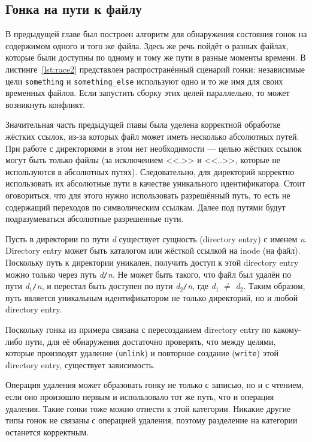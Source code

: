 \subsection{Гонка на пути к файлу}
\label{subsec:path-race}



В предыдущей главе был построен алгоритм для обнаружения состояния гонок на содержимом одного и того же файла. Здесь же речь пойдёт о разных файлах, которые были доступны по одному и тому же пути в разные моменты времени. В листинге~\ref{lst:race2} представлен распространённый сценарий гонки: независимые цели \texttt{something} и \texttt{something\_else} используют одно и то же имя для своих временных файлов. Если запустить сборку этих целей параллельно, то может возникнуть конфликт.

Значительная часть предыдущей главы была уделена корректной обработке жёстких ссылок, из-за которых файл может иметь несколько абсолютных путей. При работе с директориями в этом нет необходимости --- целью жёстких ссылок могут быть только файлы (за исключением <<.>> и <<..>>, которые не используются в абсолютных путях). Следовательно, для директорий корректно использовать их абсолютные пути в качестве уникального идентификатора. Стоит оговориться, что для этого нужно использовать разрешённый путь, то есть не содержащий переходов по символическим ссылкам. Далее под путями будут подразумеваться абсолютные разрешенные пути.

Пусть в директории по пути \textit{d} существует сущность (directory entry) с именем \textit{n}. Directory entry может быть каталогом или жёсткой ссылкой на inode (на файл). Поскольку путь к директории уникален, получить доступ к этой directory entry можно только через путь \textit{d\texttt{/}n}. Не может быть такого, что файл был удалён по пути \textit{d$_1$\texttt{/}n}, и перестал быть доступен по пути \textit{d$_2$\texttt{/}n}, где \textit{d}$_1$ $\ne$ \textit{d}$_2$. Таким образом, путь является уникальным идентификатором не только директорий, но и любой directory entry.

Поскольку гонка из примера связана с пересозданием directory entry по какому-либо пути, для её обнаружения достаточно проверять, что между целями, которые производят удаление (\texttt{unlink}) и повторное создание (\texttt{write}) этой directory entry, существует зависимость.

Операция удаления может образовать гонку не только с записью, но и с чтением, если оно произошло первым и использовало тот же путь, что и операция удаления. Такие гонки тоже можно отнести к этой категории. Никакие другие типы гонок не связаны с операцией удаления, поэтому разделение на категории останется корректным.

